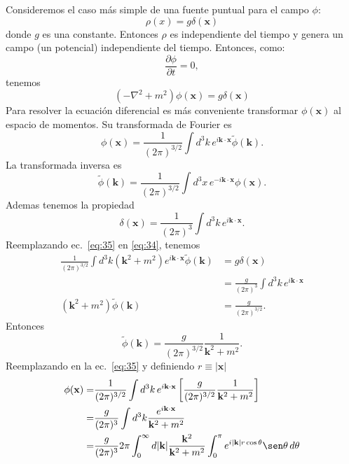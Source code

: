 Consideremos el caso m\'as simple de una fuente puntual para el campo
$\phi$:
\begin{equation}
  \label{eq:33}
  \rho(x)=g\delta(\mathbf{x})
\end{equation}
donde $g$ es una constante. Entonces $\rho$ es independiente del tiempo y
genera un campo (un potencial) independiente del tiempo. Entonces,
como:
\begin{equation*}
  \frac{\partial\phi}{\partial t}=0,
\end{equation*}
tenemos
\begin{equation}
  \label{eq:34}
  (-\nabla^2+m^2)\phi(\mathbf{x})=g\delta(\mathbf{x})
\end{equation}
Para resolver la ecuaci\'on diferencial es m\'as conveniente transformar
$\phi(\mathbf{x})$ al espacio de momentos. Su transformada de Fourier es
\begin{equation}
  \label{eq:35}
  \phi(\mathbf{x})=\frac{1}{(2\pi)^{3/2}}\int d^3k\,e^{i\mathbf{k}\cdot\mathbf{x}}\tilde\phi(\mathbf{k}).
\end{equation}
La transformada inversa es
\begin{equation}
  \label{eq:36}
  \tilde\phi(\mathbf{k})=\frac{1}{(2\pi)^{3/2}}\int d^3x\,e^{-i\mathbf{k}\cdot\mathbf{x}}\phi(\mathbf{x}).
\end{equation}
Ademas tenemos la propiedad
\begin{equation}
  \delta(\mathbf{x})=\frac{1}{(2\pi)^3}\int d^3k\,e^{i\mathbf{k}\cdot\mathbf{x}}.
\end{equation}
Reemplazando ec.~\eqref{eq:35} en \eqref{eq:34}, tenemos
\begin{align}
\frac{1}{(2\pi)^{3/2}}\int d^3k(\mathbf{k}^2+m^2)e^{i\mathbf{k}\cdot\mathbf{x}}\tilde\phi(\mathbf{k})&=g\delta(\mathbf{x})\nonumber\\
&=\frac{g}{(2\pi)^3}\int d^3k\,e^{i\mathbf{k}\cdot\mathbf{x}}\nonumber\\
(\mathbf{k}^2+m^2)\tilde\phi(\mathbf{k})&=\frac{g}{(2\pi)^{3/2}}.\nonumber
\end{align}
Entonces
\begin{equation}
  \tilde\phi(\mathbf{k})=\frac{g}{(2\pi)^{3/2}}\frac{1}{\mathbf{k}^2+m^2}.
\end{equation}
Reemplazando en la ec.~\eqref{eq:35} y definiendo $r\equiv|\mathbf{x}|$
\begin{align}
  \phi(\mathbf{x})=&\frac{1}{(2\pi)^{3/2}}\int d^3k\,e^{i\mathbf{k}\cdot\mathbf{x}}
  \left[
    \frac{g}{(2\pi)^{3/2}}\frac{1}{\mathbf{k}^2+m^2}
  \right]\nonumber\\
=&\frac{g}{(2\pi)^{3}}\int d^3k
    \frac{e^{i\mathbf{k}\cdot\mathbf{x}}}{\mathbf{k}^2+m^2}\nonumber\\
=&\frac{g}{(2\pi)^{3}}2\pi\int_0^\infty d|\mathbf{k}|
    \frac{\mathbf{k}^2}{\mathbf{k}^2+m^2}\int_0^\pi e^{i|\mathbf{k}|r\cos\theta}\sen\theta\,d\theta\nonumber
\end{align}
